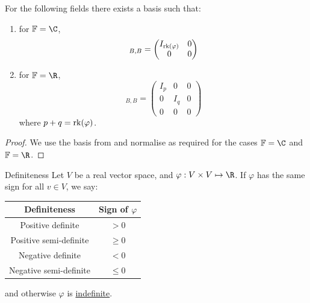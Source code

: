 \documentclass[../Main.tex]{subfiles}
\begin{document}
\begin{corollary}
    For the following fields there exists a basis such that:
    \begin{enumerate}
        \item for $\F = \C$,
            \begin{equation*}
                [\varphi]_{B, B} =
                \begin{pmatrix}
                    I_{\rk(\varphi)} & 0 \\
                    0 & 0
                \end{pmatrix}
            \end{equation*}
        \item for $\F = \R$,
            \begin{equation*}
                [\varphi]_{B, B} =
                \begin{pmatrix}
                    I_p & 0 & 0 \\
                    0 & I_q & 0 \\
                    0 & 0 & 0
                \end{pmatrix}
            \end{equation*}
            where $p + q = \operatorname{rk}(\varphi)$.
    \end{enumerate}
    \label{corSBFDiagonalForm}
\end{corollary}
\begin{proof}
    We use the basis from  and normalise as required for the cases $\F = \C$ and $\F = \R$.
\end{proof}
\begin{definition}{Definiteness}
    Let $V$ be a real vector space, and $\varphi : V \times V \mapsto \R$. If $\varphi$ has the same sign for all $v \in V$, we say:

    \begin{tabular}{|c|c|}
        \hline
        Definiteness & Sign of $\varphi$ \\
        \hline
        Positive definite & $>0$ \\
        Positive semi-definite & $\geq0$ \\
        Negative definite & $<0$ \\
        Negative semi-definite & $\leq0$ \\
        \hline
    \end{tabular}

    and otherwise $\varphi$ is \underline{indefinite}.
\end{definition}
\end{document}
